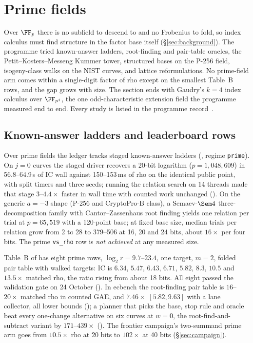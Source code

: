 \chapter{Prime fields}\label{sec:prime}

Over $\FF_p$ there is no subfield to descend to and no Frobenius to fold,
so index calculus must find structure in the factor base itself
(\S\ref{sec:background}). The programme tried known-answer ladders,
root-finding and pair-table oracles, the Petit--Kosters--Messeng Kummer
tower, structured bases on the P-256 field, isogeny-class walks on the NIST
curves, and lattice reformulations. No prime-field arm comes within a
single-digit factor of rho except on the smallest Table~B rows, and the gap
grows with size. The section ends with Gaudry's $k=4$ index calculus over
$\FF_{p^4}$, the one odd-characteristic extension field the programme
measured end to end. Every study is listed in the programme record~\cite{icprogram2026}.

\section{Known-answer ladders and leaderboard rows}

Over prime fields the ledger tracks staged known-answer ladders
(, regime \texttt{prime}). On $j=0$
curves the staged driver recovers a 20-bit logarithm
($p=1{,}048{,}609$) in 56.8--64.9\,s of IC wall against 150--153\,ms of rho
on the identical public point, with split timers and three seeds; running
the relation search on 14 threads made that stage $3$--$4.4\times$ faster in
wall time with counted work unchanged
(). On the generic $a=-3$
shape (P-256 and CryptoPro-B class), a Semaev-$\Sem4$ three-decomposition
family with Cantor--Zassenhaus root finding yields one relation per trial at
$p=65{,}519$ with a 120-point base; at fixed base size, median trials per
relation grow from 2 to 28 to 379--506 at 16, 20 and 24 bits, about
$16\times$ per four bits. The prime \texttt{vs\_rho} row is \emph{not
achieved} at any measured size.

Table~B of  has eight prime rows,
$\log_2 r=9.7$--$23.4$, one target, $m=2$, folded pair table with walked
targets: IC is $6.34$, $5.47$, $6.43$, $6.71$, $5.82$, $8.3$, $10.5$ and
$13.5\times$ matched rho, the ratio rising from about 18 bits. All eight
passed the validation gate on 24 October
(). In ecbench the root-finding
pair table is $16$--$20\times$ matched rho in counted GAE, and $7.46\times$
$[5.82,9.63]$ with a lane collector, all lower bounds
(); a planner that picks
the base, stop rule and oracle beat every one-change alternative on six
curves at $w=0$, the root-find-and-subtract variant by $171$--$439\times$
(). The frontier campaign's
two-summand prime arm goes from $10.5\times$ rho at 20 bits to $102\times$ at
40 bits (\S\ref{sec:campaign}).

